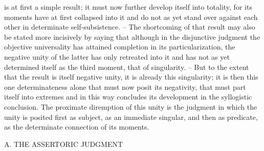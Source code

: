 is at first a simple result; it must now further develop itself into totality,
for its moments have at first collapsed into it and do not as yet stand over
against each other in determinate self-subsistence. – The shortcoming of
that result may also be stated more incisively by saying that although in
the disjunctive judgment the objective universality has attained completion
in its particularization, the negative unity of the latter has only retreated
into it and has not as yet determined itself as the third moment, that of
singularity. – But to the extent that the result is itself negative unity, it is
already this singularity; it is then this one determinateness alone that must
now posit its negativity, that must part itself into extremes and in this way
concludes its development in the syllogistic conclusion.
The proximate diremption of this unity is the judgment in which the
unity is posited first as subject, as an immediate singular, and then as
predicate, as the determinate connection of its moments.

A. THE ASSERTORIC JUDGMENT

